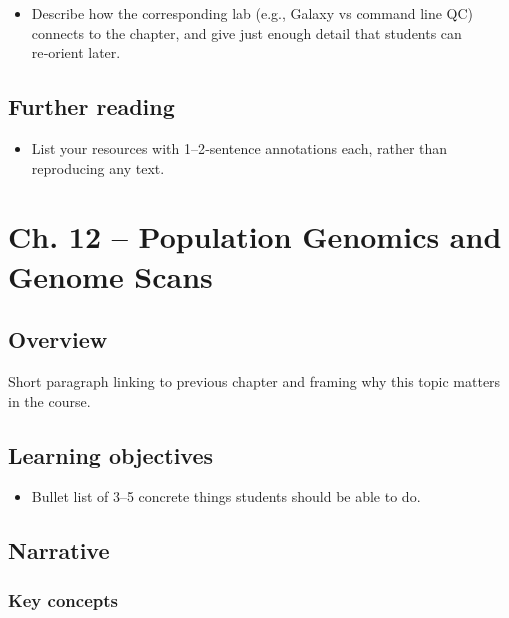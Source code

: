 \documentclass[
  letterpaper,
  DIV=11,
  numbers=noendperiod]{scrreprt}
\providecommand{\tightlist}{%
  \setlength{\itemsep}{0pt}\setlength{\parskip}{0pt}}
\begin{document}
\begin{itemize}
\tightlist
\item
  Describe how the corresponding lab (e.g., Galaxy vs command line QC)
  connects to the chapter, and give just enough detail that students can
  re‑orient later.
\end{itemize}

\section{Further reading}\label{further-reading-7}

\begin{itemize}
\tightlist
\item
  List your resources with 1--2‑sentence annotations each, rather than
  reproducing any text.
\end{itemize}


\chapter{Ch. 12 -- Population Genomics and Genome
Scans}\label{ch.-12-population-genomics-and-genome-scans}

\section{Overview}\label{overview-8}

Short paragraph linking to previous chapter and framing why this topic
matters in the course.

\section{Learning objectives}\label{learning-objectives-8}

\begin{itemize}
\tightlist
\item
  Bullet list of 3--5 concrete things students should be able to do.
\end{itemize}

\section{Narrative}\label{narrative-8}

\subsection{Key concepts}\label{key-concepts-8}
\end{document}
